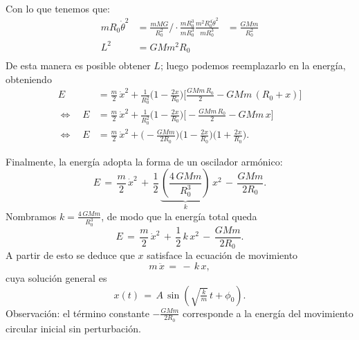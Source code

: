 \documentclass[
  11pt,
  letterpaper,
   addpoints,
  ]{exam}
\begin{document}
\begin{questions}
\begin{solution}
\begin{align}
\end{align}
Con lo que tenemos que:
\begin{align}
  mR_{0}\dot{\theta}^{2} &= \frac{mMG}{R_{0}^{2}} / \cdot \frac{mR_{0}^{3}}{mR_{0}^{3}}
  \frac{m^{2}R_{0}^{4}\dot{\theta}^{2}}{mR_{0}^{3}} &= \frac{GMm}{R_{0}^{2}}\\
  L^{2} &= GMm^{2}R_{0}\\
\end{align}
De esta manera es posible obtener $L$; luego podemos reemplazarlo en la energía, obteniendo
\begin{align}
E &= \frac{m}{2}\,\dot x^{2}
 + \frac{1}{R_0^{2}}\Big(1-\frac{2x}{R_0}\Big)\Big[\frac{GMm\,R_0}{2} - GMm\,(R_0 + x)\Big] \\
\Leftrightarrow\quad
E &= \frac{m}{2}\,\dot x^{2}
 + \frac{1}{R_0^{2}}\Big(1-\frac{2x}{R_0}\Big)\Big[-\frac{GMm\,R_0}{2} - GMm\,x\Big] \\
\Leftrightarrow\quad
E &= \frac{m}{2}\,\dot x^{2}
 + \Big(-\frac{GMm}{2R_0}\Big)\Big(1-\frac{2x}{R_0}\Big)\Big(1+\frac{2x}{R_0}\Big).
\end{align}

Finalmente, la energía adopta la forma de un oscilador armónico:
\begin{equation}
E \,=\, \frac{m}{2}\,\dot x^{2} \,+\, \frac{1}{2}\,\underbrace{\left(\frac{4\,GMm}{R_0^{3}}\right)}_{\displaystyle k}\,x^{2} \, - \, \frac{GMm}{2R_0}.
\end{equation}
Nombramos \(k = \tfrac{4\,GMm}{R_0^{3}}\), de modo que la energía total queda
\begin{equation}
E \,=\, \frac{m}{2}\,\dot x^{2} \,+\, \frac{1}{2}\,k\,x^{2} \, - \, \frac{GMm}{2R_0}.
\end{equation}
A partir de esto se deduce que \(x\) satisface la ecuación de movimiento
\begin{equation}
m\,\ddot x \,=\, -\,k\,x,
\end{equation}
cuya solución general es
\begin{equation}
x(t) \,=\, A\,\sin\!\left(\sqrt{\tfrac{k}{m}}\,t + \phi_0\right).
\end{equation}
Observación: el término constante \(-\tfrac{GMm}{2R_0}\) corresponde a la energía del movimiento circular inicial sin perturbación.


\end{solution}

\end{questions}
\end{document}
